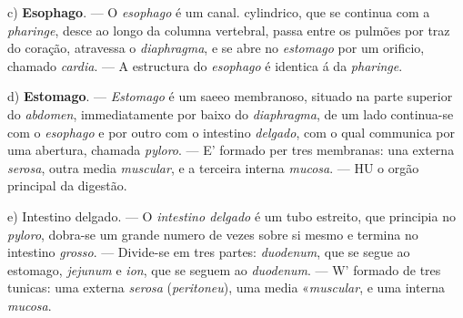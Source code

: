 c) \textbf{Esophago}. --- O \emph{esophago} é um canal. cylindrico, que se continua com a \emph{pharinge}, desce ao longo da columna vertebral, passa entre os pulmões por traz do coração, atravessa o \emph{diaphragma}, e se abre no \emph{estomago} por um orificio, chamado \emph{cardia}. --- A estructura do \emph{esophago} é identica á da \emph{pharinge}.

d) \textbf{Estomago}. --- \emph{Estomago} é um saeeo membranoso, situado na parte superior do \emph{abdomen}, immediatamente por baixo do \emph{diaphragma}, de um lado continua-se com o \emph{esophago} e por outro com o intestino \emph{delgado}, com o qual communica   por uma abertura, chamada \emph{pyloro}. --- E' formado per tres membranas: una externa \emph{serosa}, outra media \emph{muscular}, e a terceira interna \emph{mucosa}. --- HU o orgão principal da digestão.

e) Intestino delgado. --- O \emph{intestino delgado} é um tubo estreito, que principia no \emph{pyloro}, dobra-se um grande numero de vezes sobre si mesmo e termina no intestino \emph{grosso}. --- Divide-se em tres partes: \emph{duodenum}, que se segue ao estomago, \emph{jejunum} e \emph{ion}, que se seguem ao \emph{duodenum}. --- W' formado de tres tunicas: uma externa \emph{serosa} (\emph{peritoneu}), uma media «\emph{muscular}, e uma interna \emph{mucosa}.

